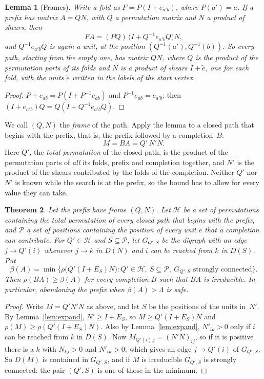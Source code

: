 \documentclass[11pt]{amsart}
\newcommand{\Lam}{\Lambda}
\newcommand{\D}{D}
\newcommand{\Pos}{\mathcal{P}}
\newcommand{\Hgp}{\mathcal{H}}
\theoremstyle{plain}
\newtheorem{Theorem}{Theorem}[section]
\newtheorem{Lemma}[Theorem]{Lemma}
\theoremstyle{definition}
\begin{document}
\begin{Lemma}[Frames]
  \label{lem:frame}
  Write a fold as $F=P(I+e_{a'b})$, where $P(a')=a$.  If a prefix has
  matrix $A=QN$, with $Q$ a permutation matrix and $N$ a product of shears,
  then
  \[
    FA=(PQ)\,\bigl(I+Q^{-1}e_{a'b}Q\bigr)N,
  \]
  and $Q^{-1}e_{a'b}Q$ is again a unit, at the position
  $(Q^{-1}(a'),Q^{-1}(b))$.  So every path, starting from the empty one,
  has matrix $QN$, where $Q$ is the product of the permutation parts of its
  folds and $N$ is a product of shears $I+\tilde e$, one for each fold, with
  the units $\tilde e$ written in the labels of the start vertex.
\end{Lemma}

\begin{proof}
  $P+e_{ab}=P(I+P^{-1}e_{ab})$ and $P^{-1}e_{ab}=e_{a'b}$; then
  $(I+e_{a'b})Q=Q(I+Q^{-1}e_{a'b}Q)$.
\end{proof}

We call $(Q,N)$ the \emph{frame} of the path.  Apply the lemma to a closed
path that begins with the prefix, that is, the prefix followed by a
completion~$B$:
\[
  M=BA=Q'\,N'N.
\]
Here $Q'$, the \emph{total permutation} of the closed path, is the product
of the permutation parts of \emph{all} its folds, prefix and completion
together, and $N'$ is the product of the shears contributed by the folds of
the completion.  Neither $Q'$ nor $N'$ is known while the search is at the
prefix, so the bound has to allow for every value they can take.

\begin{Theorem}
  \label{thm:general}
  Let the prefix have frame $(Q,N)$.  Let $\Hgp$ be a set of permutations
  containing the total permutation of every closed path that begins with
  the prefix, and $\Pos$ a set of positions containing the position of
  every unit $\tilde e$ that a completion can contribute.  For $Q'\in\Hgp$
  and $S\subseteq\Pos$, let $G_{Q',S}$ be the digraph with an edge
  $j\to Q'(i)$ whenever $j\to k$ in $\D(N)$ and $i$ can be reached from
  $k$ in $\D(S)$.  Put
  \[
    \beta(A)=\min\bigl\{\rho\bigl(Q'(I+E_S)N\bigr) :
      Q'\in\Hgp,\ S\subseteq\Pos,\ G_{Q',S}\text{ strongly connected}\bigr\}.
  \]
  Then $\rho(BA)\ge\beta(A)$ for every completion $B$ such that $BA$ is
  irreducible.  In particular, abandoning the prefix when
  $\beta(A)>\Lam$ is safe.
\end{Theorem}

\begin{proof}
  Write $M=Q'N'N$ as above, and let $S$ be the positions of the units
  in~$N'$.  By Lemma~\ref{lem:expand}, $N'\ge I+E_S$, so $M\ge Q'(I+E_S)N$
  and $\rho(M)\ge\rho(Q'(I+E_S)N)$.  Also by Lemma~\ref{lem:expand},
  $N'_{ik}>0$ only if $i$ can be reached from $k$ in $\D(S)$.  Now
  $M_{Q'(i)\,j}=(N'N)_{ij}$, so if it is positive there is a $k$ with
  $N_{kj}>0$ and $N'_{ik}>0$, which gives an edge $j\to Q'(i)$ of
  $G_{Q',S}$.  So $\D(M)$ is contained in $G_{Q',S}$, and if $M$ is
  irreducible $G_{Q',S}$ is strongly connected: the pair $(Q',S)$ is one of
  those in the minimum.
\end{proof}
\end{document}
